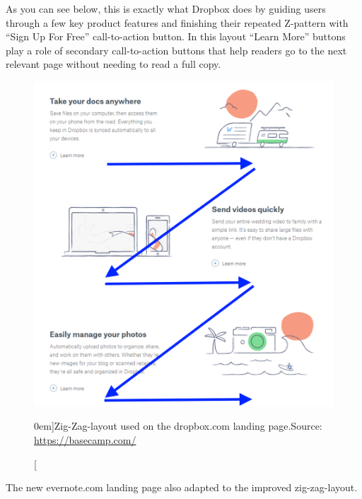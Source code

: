 As you can see below, this is exactly what Dropbox does by guiding users through a few key product features and finishing their repeated Z-pattern with “Sign Up For Free” call-to-action button. In this layout “Learn More” buttons play a role of secondary call-to-action buttons that help readers go to the next relevant page without needing to read a full copy.

\begin{figure}%
	\centering
  \includegraphics[width=1.0\textwidth]{../figures/zig-zag_dropbox.png}
  \caption[][0em]{Zig-Zag-layout used on the dropbox.com landing page.\newline Source: \url{https://basecamp.com/}}
  \label{fig:z-shape_facebook}
\end{figure}

The new evernote.com landing page also adapted to the improved zig-zag-layout.

